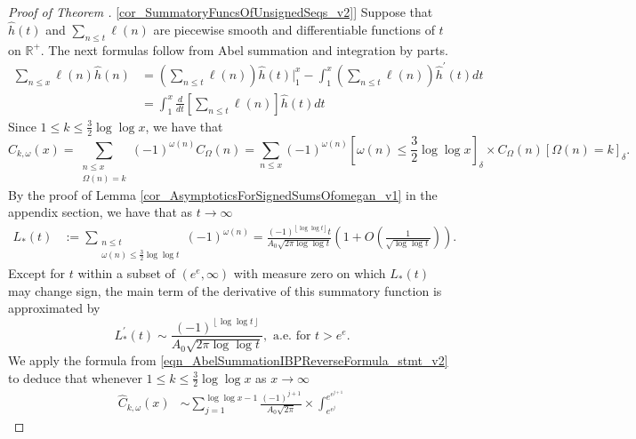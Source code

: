 \documentclass[11pt,reqno,a4letter]{article}
\newcommand{\hlocalref}[1]{\hyperref[#1]{\ref{#1}}}
\numberwithin{equation}{section}
\numberwithin{figure}{section}
\numberwithin{table}{section}
\newcommand{\Iverson}[1]{\ensuremath{\left[#1\right]_{\delta}}}
\newcommand{\floor}[1]{\left\lfloor #1 \right\rfloor}
\theoremstyle{plain}
\numberwithin{theorem}{section}
\theoremstyle{definition}
\begin{document}
\begin{proof}[Proof of Theorem \hlocalref{cor_SummatoryFuncsOfUnsignedSeqs_v2}]  
Suppose that $\hat{h}(t)$ and $\sum_{n \leq t} \ell(n)$ are 
piecewise smooth and differentiable functions of $t$ on $\mathbb{R}^{+}$. 
The next formulas follow from Abel summation and integration by parts. 
\begin{subequations}
\begin{align} 
\label{eqn_AbelSummationIBPReverseFormula_stmt_v1} 
     \sum_{n \leq x} \ell(n) \hat{h}(n) & = 
     \left(\sum_{n \leq t} \ell(n)\right) \hat{h}(t) \Biggr\rvert_1^x - 
     \int_{1}^{x} \left(\sum_{n \leq t} \ell(n)\right) \hat{h}^{\prime}(t) dt \\ 
\label{eqn_AbelSummationIBPReverseFormula_stmt_v2}
     & = 
     \int_1^{x} \frac{d}{dt}\left[\sum_{n \leq t} \ell(n)\right] \hat{h}(t) dt
\end{align} 
\end{subequations}
Since $1 \leq k \leq \frac{3}{2} \log\log x$, we have that 
\[
\widehat{C}_{k,\omega}(x) = 
     \sum_{\substack{n \leq x \\ \Omega(n)=k}} (-1)^{\omega(n)} C_{\Omega}(n) = 
     \sum_{n \leq x} (-1)^{\omega(n)} \Iverson{\omega(n) \leq \frac{3}{2} \log\log x} \times 
     C_{\Omega}(n) \Iverson{\Omega(n) = k}. 
\]
By the proof of Lemma \hlocalref{cor_AsymptoticsForSignedSumsOfomegan_v1} 
in the appendix section, we have 
that as $t \rightarrow \infty$ 
\begin{align} 
\label{eqn_ProofTag_LAsttSummatoryFuncAsymptotics_v1}
L_{\ast}(t) & := \sum_{\substack{n \leq t \\ \omega(n) \leq \frac{3}{2} \log\log t}} 
     (-1)^{\omega(n)} 
     = \frac{(-1)^{\floor{\log\log t}} t}{A_0 \sqrt{2\pi \log\log t}}\left(1 + 
     O\left(\frac{1}{\sqrt{\log\log t}}\right)\right). 
\end{align} 
Except for $t$ within a subset of $\left(e^e, \infty\right)$ with measure zero on which 
$L_{\ast}(t)$ may change sign, the main term of the derivative of this summatory function 
is approximated by 
\[
L_{\ast}^{\prime}(t) \sim \frac{(-1)^{\floor{\log\log t}}}{A_0 \sqrt{2\pi \log\log t}}, 
     \text{ a.e.\ for } t > e^e. 
\]
We apply the formula from \eqref{eqn_AbelSummationIBPReverseFormula_stmt_v2}  
to deduce that whenever $1 \leq k \leq \frac{3}{2} \log\log x$ as $x \rightarrow \infty$  
\begin{align*} 
     \widehat{C}_{k,\omega}(x) & \sim 
     \sum_{j=1}^{\log\log x-1} \frac{(-1)^{j+1}}{A_0\sqrt{2\pi}} \times \int_{e^{e^j}}^{e^{e^{j+1}}} 

\end{align*}
\end{proof}
\end{document}
